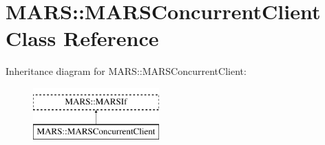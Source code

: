 \hypertarget{classMARS_1_1MARSConcurrentClient}{}\section{M\+A\+RS\+:\+:M\+A\+R\+S\+Concurrent\+Client Class Reference}
\label{classMARS_1_1MARSConcurrentClient}
Inheritance diagram for M\+A\+RS\+:\+:M\+A\+R\+S\+Concurrent\+Client\+:\begin{figure}[H]
\begin{center}
\leavevmode
\includegraphics[height=2.000000cm]{classMARS_1_1MARSConcurrentClient}
\end{center}
\end{figure}
